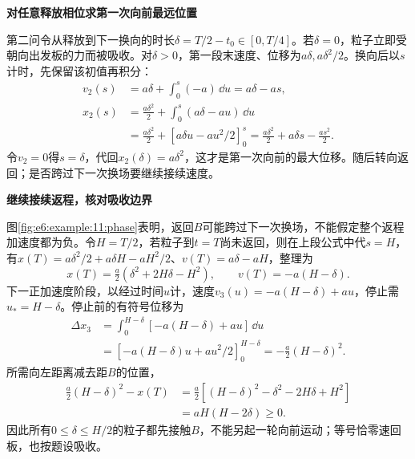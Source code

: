 \begin{solution}
\par\medskip{}\noindent\textbf{对任意释放相位求第一次向前最远位置}\par\nobreak
第二问令从释放到下一换向的时长$\delta=T/2-t_0\in[0,T/4]$。若$\delta=0$，粒子立即受朝向出发板的力而被吸收。对$\delta>0$，第一段末速度、位移为$a\delta,a\delta^2/2$。换向后以$s$计时，先保留该初值再积分：
\[
\begin{aligned}
v_2(s)&=a\delta+\int_0^s(-a)\,\dd u=a\delta-as,\\
x_2(s)&=\frac{a\delta^2}{2}+\int_0^s(a\delta-au)\,\dd u\\
&=\frac{a\delta^2}{2}+[a\delta u-au^2/2]_0^s
=\frac{a\delta^2}{2}+a\delta s-\frac{as^2}{2}.
\end{aligned}
\]
令$v_2=0$得$s=\delta$，代回$x_2(\delta)=a\delta^2$，这才是第一次向前的最大位移。随后转向返回；是否跨过下一次换场要继续接续速度。\par 

\par\medskip{}\noindent\textbf{继续接续返程，核对吸收边界}\par\nobreak
图\ref{fig:e6:example:11:phase}表明，返回$B$可能跨过下一次换场，不能假定整个返程加速度都为负。令$H=T/2$，若粒子到$t=T$尚未返回，则在上段公式中代$s=H$，有$x(T)=a\delta^2/2+a\delta H-aH^2/2$、$v(T)=a\delta-aH$，整理为
\[
 x(T)=\tfrac a2(\delta^2+2H\delta-H^2),\qquad
 v(T)=-a(H-\delta).
\]
下一正加速度阶段，以经过时间$u$计，速度$v_3(u)=-a(H-\delta)+au$，停止需$u_*=H-\delta$。停止前的有符号位移为
\[
\begin{aligned}
\Delta x_3&=\int_0^{H-\delta}[-a(H-\delta)+au]\,\dd u\\
&=[-a(H-\delta)u+au^2/2]_0^{H-\delta}
=-\frac a2(H-\delta)^2.
\end{aligned}
\]
所需向左距离减去距$B$的位置，
\[
\begin{aligned}
\frac a2(H-\delta)^2-x(T)
&=\frac a2[(H-\delta)^2-\delta^2-2H\delta+H^2]\\
&=aH(H-2\delta)\ge0.
\end{aligned}
\]
因此所有$0\le\delta\le H/2$的粒子都先接触$B$，不能另起一轮向前运动；等号恰零速回板，也按题设吸收。




\end{solution}
